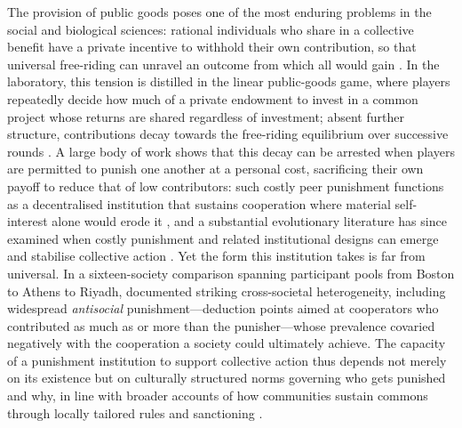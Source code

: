 \documentclass[openacc]{rsproca_new}
\begin{document}
The provision of public goods poses one of the most enduring problems in the social and biological sciences: rational individuals who share in a collective benefit have a private incentive to withhold their own contribution, so that universal free-riding can unravel an outcome from which all would gain \cite{ledyard1995public, dawes1980social}. In the laboratory, this tension is distilled in the linear public-goods game, where players repeatedly decide how much of a private endowment to invest in a common project whose returns are shared regardless of investment; absent further structure, contributions decay towards the free-riding equilibrium over successive rounds \cite{ledyard1995public}. A large body of work shows that this decay can be arrested when players are permitted to punish one another at a personal cost, sacrificing their own payoff to reduce that of low contributors: such costly peer punishment functions as a decentralised institution that sustains cooperation where material self-interest alone would erode it \cite{fehr2000cooperation, fehr2002altruistic}, and a substantial evolutionary literature has since examined when costly punishment and related institutional designs can emerge and stabilise collective action \cite{han2015avoiding,han2016synergy,song2026punishment}. Yet the form this institution takes is far from universal. In a sixteen-society comparison spanning participant pools from Boston to Athens to Riyadh, \cite{herrmann2008antisocial} documented striking cross-societal heterogeneity, including widespread \emph{antisocial} punishment---deduction points aimed at cooperators who contributed as much as or more than the punisher---whose prevalence covaried negatively with the cooperation a society could ultimately achieve. The capacity of a punishment institution to support collective action thus depends not merely on its existence but on culturally structured norms governing who gets punished and why, in line with broader accounts of how communities sustain commons through locally tailored rules and sanctioning \cite{ostrom1990governing}.
\end{document}
